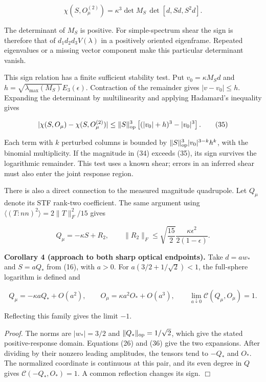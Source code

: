 \documentclass[aps,prd,reprint,onecolumn,11pt,nofootinbib,notitlepage]{revtex4-2}
\begin{document}
\begin{equation}
 \chi(S,O_\mu^{(2)})
 =\kappa^3\det M_S\,\det[d,Sd,S^2d].
 \tag{34}
\end{equation}

The determinant of \(M_S\) is positive. For simple-spectrum shear the sign is therefore that of \(d_1d_2d_3V(\lambda)\) in a positively oriented eigenframe. Repeated eigenvalues or a missing vector component make this particular determinant vanish.

This sign relation has a finite sufficient stability test. Put \(v_0=\kappa M_Sd\) and \(h=\sqrt{\lambda_{\max}(M_S)}E_3(\epsilon)\). Contraction of the remainder gives \(|v-v_0|\le h\). Expanding the determinant by multilinearity and applying Hadamard's inequality gives

\begin{equation}
 |\chi(S,O_\mu)-\chi(S,O_\mu^{(2)})|
 \le\|S\|_{\rm op}^3\left[(|v_0|+h)^3-|v_0|^3\right].
 \tag{35}
\end{equation}

Each term with \(k\) perturbed columns is bounded by \(\|S\|_{\rm op}^3|v_0|^{3-k}h^k\), with the binomial multiplicity. If the magnitude in (34) exceeds (35), its sign survives the logarithmic remainder. This test uses a known shear; errors in an inferred shear must also enter the joint response region.

There is also a direct connection to the measured magnitude quadrupole. Let \(Q_\mu\) denote its STF rank-two coefficient. The same argument using \(\langle(T:nn)^2\rangle=2\|T\|_F^2/15\) gives

\begin{equation}
 Q_\mu=-\kappa S+R_2,\qquad
 \|R_2\|_F\le\sqrt{\frac{15}{2}}
       \frac{\kappa\epsilon^2}{2(1-\epsilon)}.
 \tag{36}
\end{equation}

\textbf{Corollary 4 (approach to both sharp optical endpoints).} Take \(d=a w_*\) and \(S=aQ_*\) from (16), with \(a>0\). For \(a(3/2+1/\sqrt2)<1\), the full-sphere logarithm is defined and

\begin{equation}
 Q_\mu=-\kappa aQ_*+O(a^2),\qquad
 O_\mu=\kappa a^2O_*+O(a^3),\qquad
 \lim_{a\downarrow0}\mathcal C(Q_\mu,O_\mu)=1.
 \tag{37}
\end{equation}

Reflecting this family gives the limit \(-1\).

\emph{Proof.} The norms are \(|w_*|=3/2\) and \(\|Q_*\|_{\rm op}=1/\sqrt2\), which give the stated positive-response domain. Equations (26) and (36) give the two expansions. After dividing by their nonzero leading amplitudes, the tensors tend to \(-Q_*\) and \(O_*\). The normalized coordinate is continuous at this pair, and its even degree in \(Q\) gives \(\mathcal C(-Q_*,O_*)=1\). A common reflection changes its sign. \(\Box\)
\end{document}
